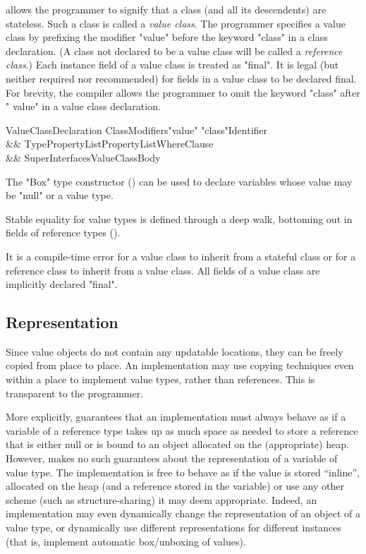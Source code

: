 {}\Xten{} allows the programmer to signify that a class (and all its
descendents) are stateless. Such a class is called a {\em value
class}.  The programmer specifies a value class by prefixing the
modifier \xcd"value" before the keyword \xcd"class" in a class
declaration.  (A class not declared to be a value class will be called
a {\em reference class}.)  Each instance field of a value class is
treated as \xcd"final". It is legal (but neither required nor recommended)
for fields in a value class to be declared final. For brevity, the \Xten{}
compiler allows the programmer to omit the keyword \xcd"class" after
\xcd" value" in a value class declaration.


\begin{grammar}
ValueClassDeclaration \:
      ClassModifiers\opt \xcd"value" \xcd"class"\opt Identifier  \\
   && TypePropertyList\opt PropertyList\opt WhereClause\opt \\
   && Super\opt Interfaces\opt ValueClassBody \\
\end{grammar}


The \xcd"Box" type constructor () can
be used to declare variables whose value may be \xcd"null" or a value
type.

Stable equality for value types is defined through a deep walk,
bottoming out in fields of reference types ().

\begin{staticrule*}
It is a compile-time error for a value class to inherit from a
stateful class or for a reference class to inherit from a value
class. All fields of a value class are implicitly declared \xcd"final".
\end{staticrule*}

\subsection{Representation}

Since value objects do not contain any updatable locations, they can
be freely copied from place to place. An implementation may use
copying techniques even within a place to implement value types,
rather than references. This is transparent to the programmer.

More explicitly, \Xten{} guarantees that an implementation must always
behave as if a variable of a reference type takes up as much space as
needed to store a reference that is either null or is bound to an
object allocated on the (appropriate) heap. However, \Xten{} makes no
such guarantees about the representation of a variable of value
type. The implementation is free to behave as if the value is stored
``inline'', allocated on the heap (and a reference stored in the
variable) or use any other scheme (such as structure-sharing) it may
deem appropriate. Indeed, an implementation may even dynamically
change the representation of an object of a value type, or dynamically
use different representations for different instances (that is,
implement automatic box/unboxing of values).

